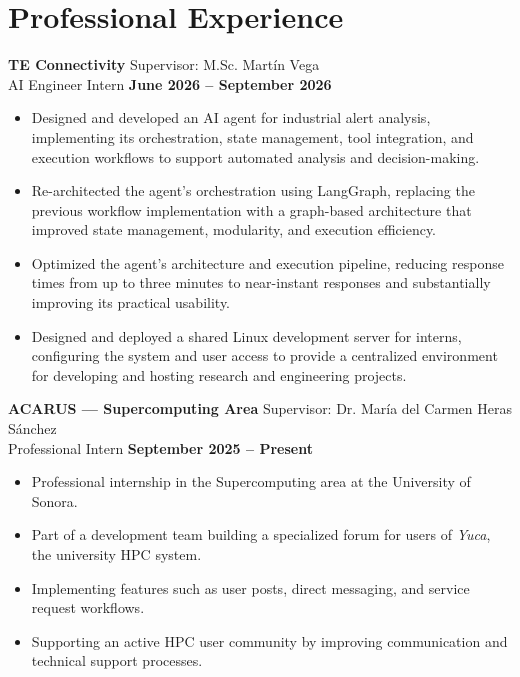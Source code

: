 \documentclass[11pt]{article}
\begin{document}
\section*{Professional Experience}
\textbf{TE Connectivity} \hfill Supervisor: M.Sc. Martín Vega \\
AI Engineer Intern \hfill \textbf{June 2026 -- September 2026}
\vspace{-0.3cm}
\begin{itemize}[leftmargin=*]
    \item Designed and developed an AI agent for industrial alert analysis, implementing its orchestration, state management, tool integration, and execution workflows to support automated analysis and decision-making.

    \vspace{-0.3cm}
    \item Re-architected the agent's orchestration using LangGraph, replacing the previous workflow implementation with a graph-based architecture that improved state management, modularity, and execution efficiency.

    \vspace{-0.3cm}
    \item Optimized the agent's architecture and execution pipeline, reducing response times from up to three minutes to near-instant responses and substantially improving its practical usability.

    \vspace{-0.3cm}
    \item Designed and deployed a shared Linux development server for interns, configuring the system and user access to provide a centralized environment for developing and hosting research and engineering projects.
\end{itemize}


\newpage
\vspace{0.2cm}
\textbf{ACARUS — Supercomputing Area} \hfill Supervisor: Dr. María del Carmen Heras Sánchez\\
Professional Intern \hfill \textbf{September 2025 -- Present}
\vspace{-0.3cm}
\begin{itemize}[leftmargin=*]
    \item Professional internship in the Supercomputing area at the University of Sonora.
    
    \vspace{-0.3cm}
    \item Part of a development team building a specialized forum for users of \textit{Yuca}, the university HPC system.
    
    \vspace{-0.3cm}
    \item Implementing features such as user posts, direct messaging, and service request workflows.
    
    \vspace{-0.3cm}
    \item Supporting an active HPC user community by improving communication and technical support processes.
\end{itemize}
\end{document}
